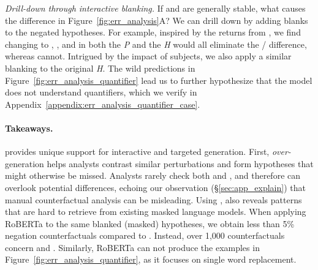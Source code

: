 \emph{Drill-down through interactive blanking.}
If  and  are generally stable, what causes the difference in Figure~\ref{fig:err_analysis}A?
We can drill down by adding blanks to the negated hypotheses.
For example, inspired by the returns from , we find changing  to , , and  in both the \emph{P} and the \emph{H} would all eliminate the / difference, whereas  cannot.
Intrigued by the impact of subjects, we also apply a similar blanking to the original \emph{H}.
The wild predictions in Figure~\ref{fig:err_analysis_quantifier} lead us to further hypothesize that the model does not understand quantifiers, which we verify in Appendix~\ref{appendix:err_analysis_quantifier_case}.


\paragraph{Takeaways.}
\sysname provides unique support for interactive and targeted generation.
First, \emph{over-}generation helps analysts contrast similar perturbations and form hypotheses that might otherwise be missed.
Analysts rarely check both  and , and therefore can overlook potential differences, echoing our observation (\S\ref{sec:app_explain}) that manual counterfactual analysis can be misleading.
Using \tagstrs, \sysname also reveals patterns that are hard to retrieve from existing masked language models.
When applying RoBERTa to the same blanked (masked) hypotheses, we obtain less than 5\% negation counterfactuals compared to \sysname.
Instead, over 1,000 counterfactuals concern  and .
Similarly, RoBERTa can not produce the examples in Figure~\ref{fig:err_analysis_quantifier}, as it focuses on single word replacement.

